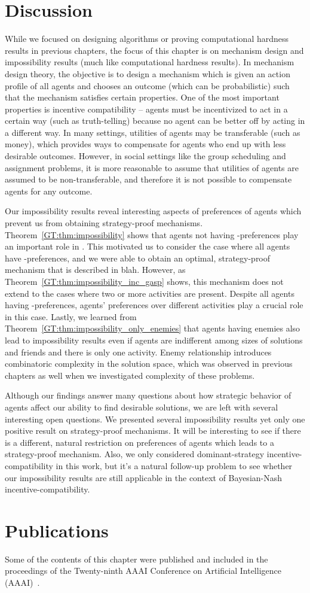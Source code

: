 \section{Discussion}

While we focused on designing algorithms or proving computational hardness results in previous chapters, the focus of this chapter is on mechanism design and impossibility results (much like computational hardness results). In mechanism design theory, the objective is to design a mechanism which is given an action profile of all agents and chooses an outcome (which can be probabilistic) such that the mechanism satisfies certain properties. One of the most important properties is incentive compatibility -- agents must be incentivized to act in a certain way (such as truth-telling) because no agent can be better off by acting in a different way. In many settings, utilities of agents may be transferable (such as money), which provides ways to compensate for agents who end up with less desirable outcomes. However, in social settings like the group scheduling and assignment problems, it is more reasonable to assume that utilities of agents are assumed to be non-transferable, and therefore it is not possible to compensate agents for any outcome. 

Our impossibility results reveal interesting aspects of preferences of agents which prevent us from obtaining strategy-proof mechanisms.  Theorem~\ref{GT:thm:impossibility} shows that agents not having \INC-preferences play an important role in \AOIP. This motivated us to consider the case where all agents have \INC-preferences, and we were able to obtain an optimal, strategy-proof mechanism that is described in blah.
However, as Theorem~\ref{GT:thm:impossibility_inc_gasp} shows, this mechanism does not extend to the cases where two or more activities are present. Despite all agents having \INC-preferences, agents' preferences over different activities play a crucial role in this case. Lastly, we learned from Theorem~\ref{GT:thm:impossibility_only_enemies} that agents having enemies also lead to impossibility results even if agents are indifferent among sizes of solutions and friends and there is only one activity. Enemy relationship introduces combinatoric complexity in the solution space, which was observed in previous chapters as well when we investigated complexity of these problems.

Although our findings answer many questions about how strategic behavior of agents affect our ability to find desirable solutions, we are left with several interesting open questions. We presented several impossibility results yet only one positive result on strategy-proof mechanisms. It will be interesting to see if there is a different, natural restriction on preferences of agents which leads to a strategy-proof mechanism. Also, we only considered dominant-strategy incentive-compatibility in this work, but it's a natural follow-up problem to see whether our impossibility results are still applicable in the context of Bayesian-Nash incentive-compatibility. %


\section*{Publications}
Some of the contents of this chapter were published and included in the proceedings of the Twenty-ninth AAAI Conference on Artificial Intelligence  (AAAI)~\cite{LEE15AAAI}.